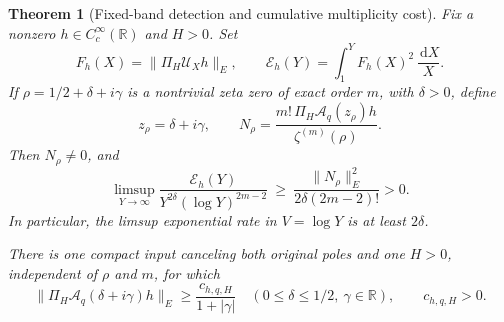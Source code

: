 \documentclass[11pt]{article}
\newtheorem{theorem}{Theorem}
\theoremstyle{remark}\newtheorem{remark}[theorem]{Remark}
\newcommand{\R}{\mathbb R}
\newcommand{\dd}{\,\mathrm d}
\begin{document}
\begin{theorem}[Fixed-band detection and cumulative multiplicity cost]
\label{thm:fixed-band-cumulative}
Fix a nonzero \(h\in C_c^\infty(\R)\) and \(H>0\). Set
\[
 F_h(X)=\|\Pi_H\mathcal U_Xh\|_E,\qquad
 \mathcal E_h(Y)=\int_1^Y F_h(X)^2\,\frac{\dd X}{X}.
 \tag{FB4}\label{eq:cumulative-log-source}
\]
If \(\rho=1/2+\delta+i\gamma\) is a nontrivial zeta zero of
exact order \(m\), with \(\delta>0\), define
\[
 z_\rho=\delta+i\gamma,\qquad
 N_\rho=\frac{m!\,\Pi_H\mathcal A_q(z_\rho)h}
                      {\zeta^{(m)}(\rho)} .
 \tag{FB5}\label{eq:fixed-band-laurent}
\]
Then \(N_\rho\ne0\), and
\[
 \limsup_{Y\to\infty}
 \frac{\mathcal E_h(Y)}{Y^{2\delta}(\log Y)^{2m-2}}
 \ \ge\ \frac{\|N_\rho\|_E^2}{2\delta(2m-2)!}>0 .
 \tag{FB6}\label{eq:cumulative-multiplicity-lower}
\]
In particular, the limsup exponential rate in \(V=\log Y\)
is at least \(2\delta\).

There is one compact input canceling both original poles and
one \(H>0\), independent of \(\rho\) and \(m\), for which
\[
 \|\Pi_H\mathcal A_q(\delta+i\gamma)h\|_E
       \ge \frac{c_{h,q,H}}{1+|\gamma|}
       \quad(0\le\delta\le1/2,\ \gamma\in\R),
 \qquad c_{h,q,H}>0 .
 \tag{FB7}\label{eq:uniform-height-numerator}
\]
\end{theorem}
\end{document}
